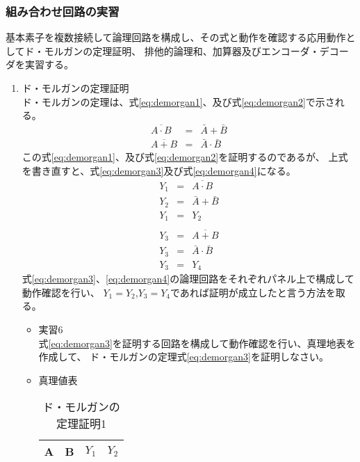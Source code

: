 \documentclass[dvipdfmx]{jsarticle}
\begin{document}
			\subsubsection{組み合わせ回路の実習}
				基本素子を複数接続して論理回路を構成し、その式と動作を確認する応用動作としてド・モルガンの定理証明、
				排他的論理和、加算器及びエンコーダ・デコーダを実習する。
				\begin{enumerate}
					\item ド・モルガンの定理証明 \\
						ド・モルガンの定理は、式\ref{eq:demorgan1}、及び式\ref{eq:demorgan2}で示される。
						\begin{eqnarray}
							\label{eq:demorgan1}
							\overline{A \cdot B} &=& \bar{A} + \bar{B} \\
							\label{eq:demorgan2}
							\overline{A + B} &=& \bar{A} \cdot \bar{B}
						\end{eqnarray}
						この式\ref{eq:demorgan1}、及び式\ref{eq:demorgan2}を証明するのであるが、
						上式を書き直すと、式\ref{eq:demorgan3}及び式\ref{eq:demorgan4}になる。
						\begin{eqnarray}
							\label{eq:demorgan3}
							Y_1 &=& \overline{A \cdot B} \\
							Y_2 &=& \bar{A} + \bar{B} \\
							Y_1 &=& Y_2 \\
						\end{eqnarray}
						\begin{eqnarray}
							\label{eq:demorgan4}
							Y_3 &=& \overline{A + B} \\
							Y_3 &=& \bar{A} \cdot \bar{B} \\
							Y_3 &=& Y_4
						\end{eqnarray}
						式\ref{eq:demorgan3}、\ref{eq:demorgan4}の論理回路をそれぞれパネル上で構成して動作確認を行い、
						$Y_1=Y_2$,$Y_3=Y_4$であれば証明が成立したと言う方法を取る。
						\begin{itemize}
							\item 実習6 \\
								式\ref{eq:demorgan3}を証明する回路を構成して動作確認を行い、真理地表を作成して、
								ド・モルガンの定理式\ref{eq:demorgan3}を証明しなさい。
							\item 真理値表
								\begin{table}[H]
									\center
									\caption{ド・モルガンの定理証明1 \label{tb:demorgan1}}
									\begin{tabular}{|c|c|c|c|}
										\hline
										A & B & $Y_1$ &$Y_2$ \\ \hline

\end{tabular}
\end{table}
\end{itemize}
\end{enumerate}
\end{document}

